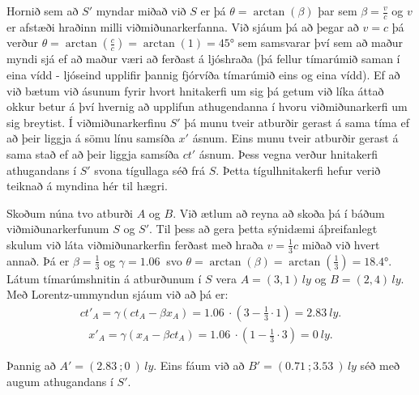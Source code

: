 \ifdefined \wholebook \else\documentclass[oneside]{book}\usepackage{EdlBook}\graphicspath{{figures/}}
\begin{document}
\begin{minipage}{\linewidth}
\vspace{0.2cm}

Hornið sem að $S'$ myndar miðað við $S$ er þá $\theta = \arctan(\beta)$ þar sem $\beta = \frac{v}{c}$ og $v$ er afstæði hraðinn milli viðmiðunarkerfanna. Við sjáum þá að þegar að $v = c$ þá verður $\theta = \arctan(\frac{c}{c}) =  \arctan(1) = \ang{45}$ sem samsvarar því sem að maður myndi sjá ef að maður væri að ferðast á ljóshraða (þá fellur tímarúmið saman í eina vídd - ljóseind upplifir þannig fjórvíða tímarúmið eins og eina vídd). Ef að við bætum við ásunum fyrir hvort hnitakerfi um sig þá getum við líka áttað okkur betur á því hvernig að upplifun athugendanna í hvoru viðmiðunarkerfi um sig breytist. Í viðmiðunarkerfinu $S'$ þá munu tveir atburðir gerast á sama tíma ef að þeir liggja á sömu línu samsíða $x'$ ásnum. Eins munu tveir atburðir gerast á sama stað ef að þeir liggja samsíða $ct'$ ásnum. Þess vegna verður hnitakerfi athugandans í $S'$ svona tígullaga séð frá $S$. Þetta tígulhnitakerfi hefur verið teiknað á myndina hér til hægri.

\vspace{0.3cm}

Skoðum núna tvo atburði $A$ og $B$. Við ætlum að reyna að skoða þá í báðum viðmiðunarkerfunum $S$ og $S'$. Til þess að gera þetta sýnidæmi áþreifanlegt skulum við láta viðmiðunarkerfin ferðast með hraða $v = \frac{1}{3}c$ miðað við hvert annað. Þá er $\beta = \frac{1}{3}$ og $\gamma = \SI{1.06}{}$ svo $\theta = \arctan(\beta) = \arctan(\frac{1}{3}) = \ang{18.4} $. Látum tímarúmshnitin á atburðunum í $S$ vera $A = (3,1) \, \si{ly}$ og $B = (2,4) \, \si{ly}$. Með Lorentz-ummyndun sjáum við að þá er:
\begin{align*}
  ct'_A = \gamma(ct_A - \beta x_A) = \SI{1.06}{} \cdot \left( 3 - \frac{1}{3} \cdot 1 \right) = \SI{2.83}{ly}.
\end{align*}
\begin{align*}
  x'_A = \gamma(x_A -  \beta ct_A) = \SI{1.06}{} \cdot \left( 1 - \frac{1}{3} \cdot 3 \right) = \SI{0}{ly}.
\end{align*}
\end{minipage}

\vspace{0.2cm}
Þannig að $A' = (\SI{2.83}{};\SI{0}{}) \, \si{ly}$. Eins fáum við að $B' = (\SI{0.71}{};\SI{3.53}{}) \, \si{ly}$ séð með augum athugandans í $S'$.
\end{document}
